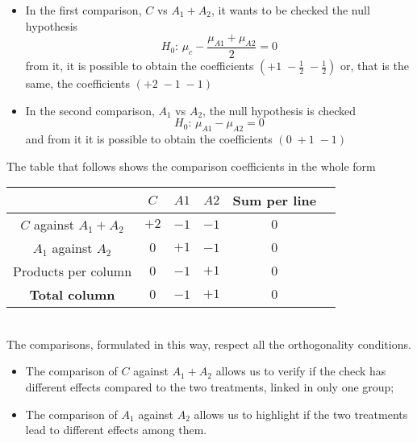 \begin{frame}
  \vspace*{.75cm}
  \begin{itemize}
    \item In the first comparison, $C$ vs $A_1+A_2$, it wants to be checked the null hypothesis
    $$ H_0:\,\mu_c-\frac{\mu_{A1}+\mu_{A2}}{2} = 0 $$
    from it, it is possible to obtain the coefficients $(+1\;-\frac{1}{2}\;-\frac{1}{2})$ or, that is the same, the coefficients $ (+2 \; -1 \; -1) $\\
    \vspace*{.75cm}
    \item In the second comparison, $A_1$ vs $A_2$, the null hypothesis is checked
    $$ H_0:\,\mu_{A1}-\mu_{A2} = 0 $$
    and from it it is possible to obtain the coefficients $(0\;+1\;-1)$
  \end{itemize}
\end{frame}

\begin{frame}
  \vspace{.25cm}
  The table that follows shows the comparison coefficients in the whole form\\
  \vspace{.25cm}
  \hspace{.75cm}
  \begin{tabular}{|c|c|c|c|c c|}
    \cline{2-6}
    \multicolumn{1}{c|}{\hspace*{3.5cm}}  & $ C $  & $ A1 $ & $ A2 $ & \textbf{Sum per line} & \\ \hline
                    $C$ against $A_1+A_2$  & $ +2 $ & $ -1 $ & $ -1 $ & $ 0 $                   & \\ \hline
                      $A_1$ against $A_2$  & $ 0 $  & $ +1 $ & $ -1 $ & $ 0 $                   & \\ \hline
                    Products per column  & $ 0 $  & $ -1 $ & $ +1 $ & $ 0 $                   & \\ \hline
                 \textbf{Total column}  & $ 0 $  & $ -1 $ & $ +1 $ & $ 0 $                   & \\ \hline
  \end{tabular}\\
  \vspace{0.2cm}
  The comparisons, formulated in this way, respect all the orthogonality conditions.\\
  \vspace{.20cm}
  \begin{itemize}
    \item The comparison of $C$ against $A_1+A_2$ allows us to verify if the check has different effects compared to the two treatments, linked in only one group;
    \item The comparison of $A_1$ against $A_2$ allows us to highlight if the two treatments lead to different effects among them.  
  \end{itemize}
\end{frame}

